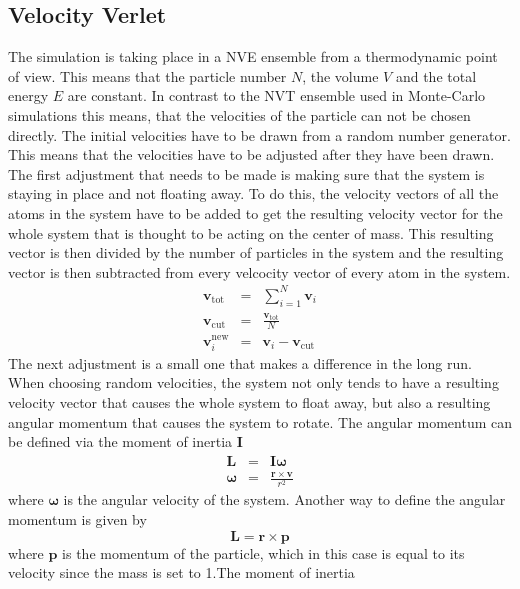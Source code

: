 \documentclass[12pt]{article}
\begin{document}
\subsection{Velocity Verlet}
The simulation is taking place in a NVE ensemble from a thermodynamic point of view. This means that the particle number $N$, the volume $V$ and the
total energy $E$ are constant. In contrast to the NVT ensemble used in Monte-Carlo simulations this means, that the velocities of the particle can not
be chosen directly. The initial velocities have to be drawn from a random number generator. This means that the velocities have to be adjusted after 
they have been drawn.\\
The first adjustment that needs to be made is making sure that the system is staying in place and not floating away. To do this, the velocity vectors
of all the atoms in the system have to be added to get the resulting velocity vector for the whole system that is thought to be acting on the center
of mass. This resulting vector is then divided by the number of particles in the system and the resulting vector is then subtracted from every
velcocity vector of every atom in the system. 
\begin{eqnarray}
    \mathbf{v}_\text{tot} &=& \sum_{i=1}^N \mathbf{v}_i\\
    \mathbf{v}_\text{cut} &=& \frac{\mathbf{v}_\text{tot}}N\\
    \mathbf{v}_i^\text{new} &=& \mathbf{v}_i - \mathbf{v}_\text{cut}
\end{eqnarray}
The next adjustment is a small one that makes a difference in the long run. When choosing random velocities, the system not only tends to have a
resulting velocity vector that causes the whole system to float away, but also a resulting angular momentum that causes the system to rotate.
The angular momentum can be defined via the moment of inertia $\mathbf{I}$
\begin{eqnarray}
    \label{eq:angularmomentum}\mathbf{L} &=& \mathbf{I}\boldsymbol{\omega}\\
    \boldsymbol{\omega} &=& \frac{\mathbf{r} \times \mathbf{v}}{r^2}
\end{eqnarray}
where $\boldsymbol{\omega}$ is the angular velocity of the system. Another way to define the angular momentum is given by
\begin{equation}
    \label{eq:angularmomentum2}
    \mathbf{L} = \mathbf{r} \times \mathbf{p}
\end{equation}
where $\mathbf{p}$ is the momentum of the particle, which in this case is equal to its velocity since the mass is set to 1.The moment of inertia 
\end{document}
